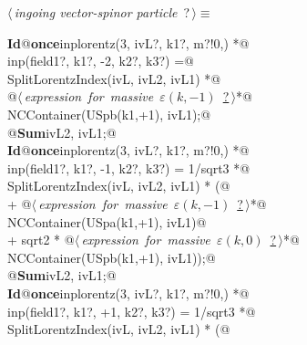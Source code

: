 \documentclass[a4paper,12pt]{amsart}
\renewcommand{\NWtarget}[2]{\hypertarget{#1}{#2}}
\renewcommand{\NWlink}[2]{\hyperlink{#1}{#2}}
\begin{document}
\begin{flushleft} \small
\begin{minipage}{\linewidth}\label{scrap33}\raggedright\small
\NWtarget{nuweb?}{} $\langle\,${\it ingoing vector-spinor particle}\nobreak\ {\footnotesize {?}}$\,\rangle\equiv$
\vspace{-1ex}
\begin{list}{}{} \item
\mbox{}\verb@@\hbox{\sffamily\bfseries Id}\verb@ @\hbox{\sffamily\bfseries once}\verb@ inplorentz(3, ivL?, k1?, m?!{0,}) *@\\
\mbox{}\verb@      inp(field1?, k1?, -2, k2?, k3?) =@\\
\mbox{}\verb@   SplitLorentzIndex(ivL, ivL2, ivL1) *@\\
\mbox{}\verb@   @\hbox{$\langle\,${\it expression for massive $\varepsilon(k, -1)$}\nobreak\ {\footnotesize \NWlink{nuweb?}{?}}$\,\rangle$}\verb@ *@\\
\mbox{}\verb@   NCContainer(USpb(k1,+1), ivL1);@\\
\mbox{}\verb@   @\hbox{\sffamily\bfseries Sum}\verb@ ivL2, ivL1;@\\
\mbox{}\verb@@\hbox{\sffamily\bfseries Id}\verb@ @\hbox{\sffamily\bfseries once}\verb@ inplorentz(3, ivL?, k1?, m?!{0,}) *@\\
\mbox{}\verb@      inp(field1?, k1?, -1, k2?, k3?) = 1/sqrt3 *@\\
\mbox{}\verb@   SplitLorentzIndex(ivL, ivL2, ivL1) * (@\\
\mbox{}\verb@   + @\hbox{$\langle\,${\it expression for massive $\varepsilon(k, -1)$}\nobreak\ {\footnotesize \NWlink{nuweb?}{?}}$\,\rangle$}\verb@ *@\\
\mbox{}\verb@     NCContainer(USpa(k1,+1), ivL1)@\\
\mbox{}\verb@   + sqrt2 * @\hbox{$\langle\,${\it expression for massive $\varepsilon(k, 0)$}\nobreak\ {\footnotesize \NWlink{nuweb?}{?}}$\,\rangle$}\verb@ *@\\
\mbox{}\verb@     NCContainer(USpb(k1,+1), ivL1));@\\
\mbox{}\verb@   @\hbox{\sffamily\bfseries Sum}\verb@ ivL2, ivL1;@\\
\mbox{}\verb@@\hbox{\sffamily\bfseries Id}\verb@ @\hbox{\sffamily\bfseries once}\verb@ inplorentz(3, ivL?, k1?, m?!{0,}) *@\\
\mbox{}\verb@      inp(field1?, k1?, +1, k2?, k3?) = 1/sqrt3 *@\\
\mbox{}\verb@   SplitLorentzIndex(ivL, ivL2, ivL1) * (@\\

\end{list}
\end{minipage}
\end{flushleft}
\end{document}
